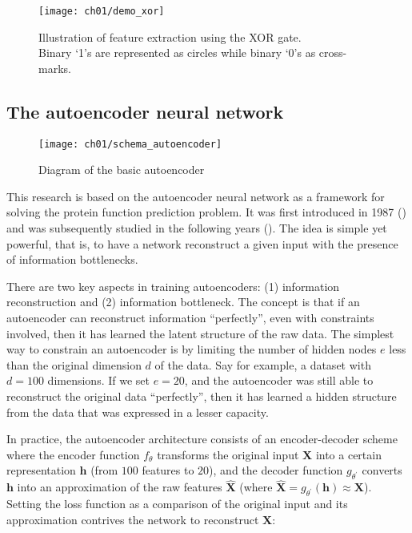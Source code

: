 \begin{figure}[!t]
  \centering
  \texttt{[image: ch01/demo\_xor]}
  \caption[Illustration of feature extraction using the XOR gate]
    {Illustration of feature extraction using the XOR gate.\\ Binary `1's are
    represented as circles while binary `0's as cross-marks.}
  \label{demo:xor}
\end{figure}

\subsection{The autoencoder neural network}

\begin{wrapfigure}{r}{0.5\textwidth}
  \centering
  \texttt{[image: ch01/schema\_autoencoder]}
  \caption[Diagram of the basic autoencoder]{
      Diagram of the basic autoencoder
  }
  \label{schema:autoencoder}
\end{wrapfigure}

\par This research is based on the autoencoder neural network as a framework
for solving the protein function prediction problem. It was first introduced
in 1987 (\cite{lecun1987phd}) and was subsequently studied in the following
years (\cite{bourlard1988auto, hinton1994autoencoders}). The idea is simple
yet powerful, that is, to have a network reconstruct a given input with the
presence of information bottlenecks.

\par There are two key aspects in training autoencoders: (1) information
reconstruction and (2) information bottleneck. The concept is that if an
autoencoder can reconstruct information ``perfectly'', even with constraints
involved, then it has learned the latent structure of the raw data. The
simplest way to constrain an autoencoder is by limiting the number of hidden
nodes $e$ less than the original dimension $d$ of the data. Say for example,
a dataset with $d=100$ dimensions. If we set $e=20$, and the autoencoder was
still able to reconstruct the original data ``perfectly'', then it has
learned a hidden structure from the data that was expressed in a lesser
capacity.

\par In practice, the autoencoder architecture consists of an encoder-decoder
scheme where the encoder function $f_{\theta}$ transforms the original input
$\mathbf{X}$ into a certain representation $\mathbf{h}$ (from $100$ features
to $20$), and the decoder function $g_{\theta^{\prime}}$ converts
$\mathbf{h}$ into an approximation of the raw features
$\mathbf{\widehat{X}}$ (where $\mathbf{\widehat{X}} =
g_{\theta^{\prime}}(\mathbf{h}) \approx \mathbf{X}$). Setting the loss
function as a comparison of the original input and its approximation
contrives the network to reconstruct $\mathbf{X}$:

